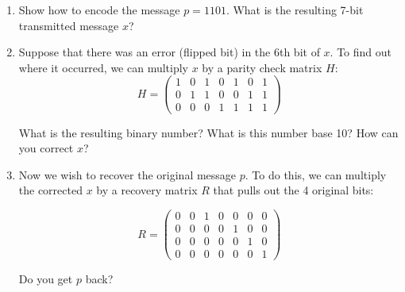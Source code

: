 \documentclass[11pt]{article}
\newif\ifsolutions
\begin{document}
\begin{enumerate}
\begin{enumerate}

\item Show how to encode the message $p=1101$.  What is the resulting 7-bit transmitted message $x$?
\vspace{30mm}

\ifsolutions 
\vspace{-30mm}
{\color{blue}{
\textbf{Solutions:} $Gp = x = 1010101$.
}}
\fi

\item Suppose that there was an error (flipped bit) in the 6th bit of $x$. To find out where it occurred, we can multiply $x$ by a parity check matrix $H$:
\[ H = \left( \begin{array}{ccccccc} 1 & 0 & 1 & 0 & 1 & 0 & 1 \\
0 & 1 & 1 & 0 & 0 & 1 & 1 \\
0 & 0 & 0 & 1 & 1 & 1 & 1
\end{array} \right)
\]   

What is the resulting binary number?  What is this number base 10? How can you correct $x$?
\vspace{30mm}

\ifsolutions 
\vspace{-30mm}
{\color{blue}{
\textbf{Solutions:} We actually received $x' = 1010111$. Computing $Hx'$, we get the sixth column of $H$, which corresponds to 6 in binary, so we know the 6th bit should be flipped to correct $x$.
}}
\fi

\item Now we wish to recover the original message $p$. To do this, we can multiply the corrected $x$ by a recovery matrix $R$ that pulls out the 4 original bits:

\[ R = \left( \begin{array}{ccccccc} 0 & 0 & 1 & 0 & 0 & 0 & 0 \\
0 & 0 & 0 & 0 & 1 & 0 & 0 \\
0 & 0 & 0 & 0 & 0 & 1 & 0 \\
0 & 0 & 0 & 0 & 0 & 0 & 1
\end{array} \right)
\]   

Do you get $p$ back?

\ifsolutions 
{\color{blue}{
\textbf{Solutions:} After correcting $x$, we compute $Rx = p$, and get back $p=1101$.
}}
\fi

\end{enumerate}
 \end{enumerate}
\end{document}
